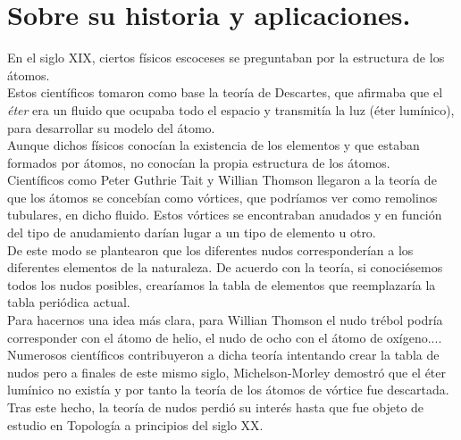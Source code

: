 \bigskip
\section{Sobre su historia y aplicaciones.}
En el siglo XIX, ciertos físicos escoceses se preguntaban por la estructura de los átomos.\\
Estos científicos tomaron como base la teoría de Descartes, que afirmaba que el \textit{éter} era un fluido que ocupaba todo el espacio y transmitía la luz (éter lumínico), para desarrollar su modelo del átomo. \\
Aunque dichos físicos conocían la existencia de los elementos y que estaban formados por átomos, no conocían la propia estructura de los átomos. \\

Científicos como Peter Guthrie Tait y Willian Thomson llegaron a la teoría de que los átomos se concebían como vórtices, que podríamos ver como remolinos tubulares, en dicho fluido. Estos vórtices se encontraban anudados y en función del tipo de anudamiento darían lugar a un tipo de elemento u otro.\\
De este modo se plantearon que los diferentes nudos corresponderían a los diferentes elementos de la naturaleza. De acuerdo con la teoría, si conociésemos todos los nudos posibles, crearíamos la tabla de elementos que reemplazaría la tabla periódica actual. \\

Para hacernos una idea más clara, para Willian Thomson el nudo trébol podría corresponder con el átomo de helio, el nudo de ocho con el átomo de oxígeno....\\

Numerosos científicos contribuyeron a dicha teoría intentando crear la tabla de nudos pero a finales de este mismo siglo, Michelson-Morley demostró que el éter lumínico no existía y por tanto la teoría de los átomos de vórtice fue descartada. \\

Tras este hecho, la teoría de nudos perdió su interés hasta que fue objeto de estudio en Topología a principios del siglo XX.\\

